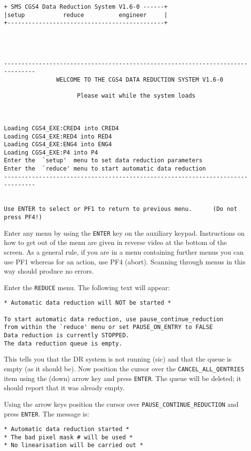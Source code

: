 \begin{verbatim}
+ SMS CGS4 Data Reduction System V1.6-0 ------+
|setup           reduce          engineer     |
+---------------------------------------------+




-------------------------------------------------------------------------------
               WELCOME TO THE CGS4 DATA REDUCTION SYSTEM V1.6-0

                     Please wait while the system loads



Loading CGS4_EXE:CRED4 into CRED4
Loading CGS4_EXE:RED4 into RED4
Loading CGS4_EXE:ENG4 into ENG4
Loading CGS4_EXE:P4 into P4
Enter the  `setup'  menu to set data reduction parameters
Enter the  `reduce' menu to start automatic data reduction
-------------------------------------------------------------------------------


Use ENTER to select or PF1 to return to previous menu.      (Do not press PF4!)
\end{verbatim}

Enter any menu by using the {\tt ENTER} key on the auxiliary keypad.
Instructions on how to get out of the menu are given in reverse video at the
bottom of the screen. As a general rule, if you are in a menu containing
further menus you  can use PF1 whereas for an action, use PF4 (abort). Scanning
through menus in  this way should produce no errors.

Enter the {\tt REDUCE} menu. The following text will appear:

\begin{verbatim}
* Automatic data reduction will NOT be started *

To start automatic data reduction, use pause_continue_reduction
from within the `reduce' menu or set PAUSE_ON_ENTRY to FALSE
Data reduction is currently STOPPED.
The data reduction queue is empty.
\end{verbatim}

This tells you that the DR system is not running (sic) and that the queue is
empty (as it should be). Now position the cursor over the 
{\tt CANCEL\_ALL\_QENTRIES} item using the (down) arrow 
key and press {\tt ENTER}. The queue will be deleted; it should report that it 
was already empty.

Using the arrow keys position the cursor over {\tt PAUSE\_CONTINUE\_REDUCTION}
and press {\tt ENTER}. The message is:

\begin{verbatim}
* Automatic data reduction started *
* The bad pixel mask # will be used *
* No linearisation will be carried out *
\end{verbatim}

